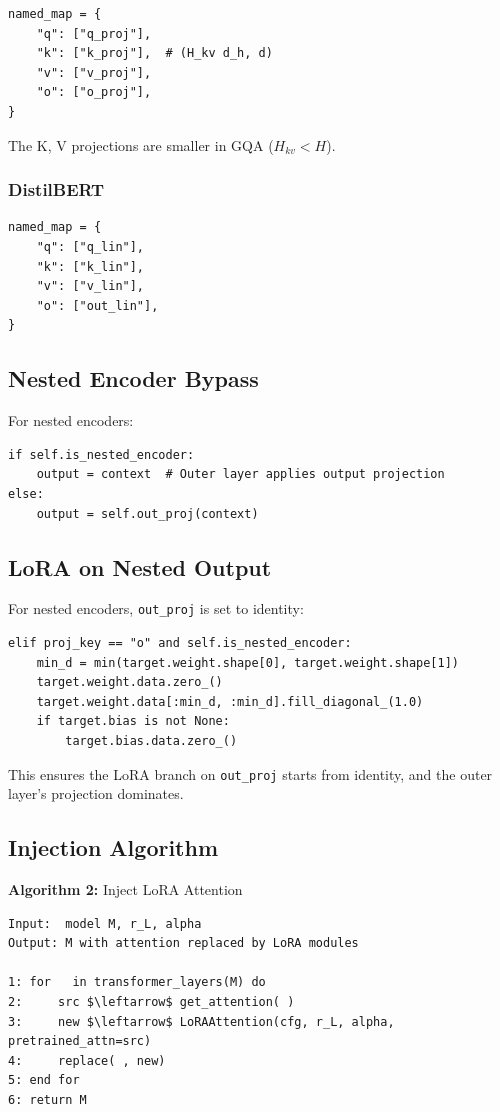 \begin{lstlisting}
named_map = {
    "q": ["q_proj"],
    "k": ["k_proj"],  # (H_kv d_h, d)
    "v": ["v_proj"],
    "o": ["o_proj"],
}
\end{lstlisting}

The K, V projections are smaller in GQA ($H_{kv} < H$).

\subsubsection{DistilBERT}

\begin{lstlisting}
named_map = {
    "q": ["q_lin"],
    "k": ["k_lin"],
    "v": ["v_lin"],
    "o": ["out_lin"],
}
\end{lstlisting}

\subsection{Nested Encoder Bypass}

For nested encoders:

\begin{lstlisting}
if self.is_nested_encoder:
    output = context  # Outer layer applies output projection
else:
    output = self.out_proj(context)
\end{lstlisting}

\subsection{LoRA on Nested Output}

For nested encoders, \texttt{out\_proj} is set to identity:

\begin{lstlisting}
elif proj_key == "o" and self.is_nested_encoder:
    min_d = min(target.weight.shape[0], target.weight.shape[1])
    target.weight.data.zero_()
    target.weight.data[:min_d, :min_d].fill_diagonal_(1.0)
    if target.bias is not None:
        target.bias.data.zero_()
\end{lstlisting}

This ensures the LoRA branch on \texttt{out\_proj} starts from identity, and the 
outer layer's projection dominates.

\subsection{Injection Algorithm}

\textbf{Algorithm 2:} Inject LoRA Attention
\begin{lstlisting}
Input:  model M, r_L, alpha
Output: M with attention replaced by LoRA modules

1: for   in transformer_layers(M) do
2:     src $\leftarrow$ get_attention( )
3:     new $\leftarrow$ LoRAAttention(cfg, r_L, alpha, pretrained_attn=src)
4:     replace( , new)
5: end for
6: return M
\end{lstlisting}

